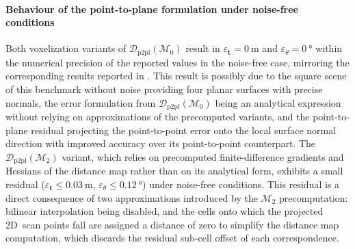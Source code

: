 \paragraph{Behaviour of the point-to-plane formulation under
noise-free conditions}
Both voxelization variants of
$\mathcal{D}_{\mathrm{p2pl}}(\mathcal{M}_0)$ result in
$\varepsilon_{\mathbf{t}} = \SI{0}{\metre}$ and
$\varepsilon_{\theta} = \SI{0}{\degree}$ within the numerical
precision of the reported values in the noise-free case, mirroring
the corresponding results reported in .
This result is possibly due to the square scene of this benchmark without noise
providing four planar surfaces with precise normals, the error formulation from
$\mathcal{D}_{\mathrm{p2pl}}(\mathcal{M}_0)$ being an analytical expression
without relying on approximations of the precomputed variants, and the
point-to-plane residual projecting the point-to-point error onto the local
surface normal direction with improved accuracy over its point-to-point counterpart.
The $\mathcal{D}_{\mathrm{p2pl}}(\mathcal{M}_2)$ variant, which
relies on precomputed finite-difference gradients and Hessians of
the distance map rather than on its analytical form, exhibits a
small residual ($\varepsilon_{\mathbf{t}} \leq \SI{0.03}{\metre}$,
$\varepsilon_{\theta} \leq \SI{0.12}{\degree}$) under
noise-free conditions. This residual is a direct consequence of two
approximations introduced by the $\mathcal{M}_2$ precomputation:
bilinear interpolation being disabled, and the cells onto which the projected
2D~scan points fall are assigned a distance of zero to simplify the
distance map computation, which discards the residual sub-cell
offset of each correspondence.

